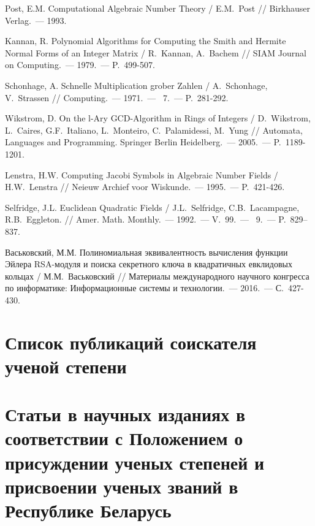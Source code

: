 \documentclass[_00_dissertation.tex]{subfiles}
\begin{document}
\begin{thebibliography}{99}
    Post, E.M. Computational Algebraic Number Theory / E.M.~Post // Birkhauser Verlag.~--- 1993.

    Kannan, R. Polynomial Algorithms for Computing the Smith and Hermite Normal Forms of an Integer Matrix / R.~Kannan, A.~Bachem // SIAM Journal on Computing.~--- 1979.~--- P.~499-507.

    Schonhage, A. Schnelle Multiplication grober Zahlen / A.~Schonhage, V.~Strassen // Computing.~--- 1971.~--- \textnumero~7.~--- P.~281-292.

    Wikstrom, D. On the l-Ary GCD-Algorithm in Rings of Integers / D.~Wikstrom, L.~Caires, G.F.~Italiano, L.~Monteiro, C.~Palamidessi, M.~Yung // Automata, Languages and Programming. Springer Berlin Heidelberg.~--- 2005.~--- P.~1189-1201.

    Lenstra, H.W. Computing Jacobi Symbols in Algebraic Number Fields / H.W.~Lenstra // Neieuw Archief voor Wiskunde.~--- 1995.~--- P.~421-426.

    Selfridge, J.L. Euclidean Quadratic Fields / J.L.~Selfridge, C.B.~Lacampagne, R.B.~Eggleton. // Amer. Math. Monthly.~--- 1992.~--- V.~99.~--- \textnumero~9.~--- P.~829--837.

    Васьковский, М.М. Полиномиальная эквивалентность вычисления функции Эйлера RSA-модуля и поиска секретного ключа в квадратичных евклидовых кольцах / М.М.~Васьковский // Материалы международного научного конгресса по информатике: Информационные системы и технологии.~--- 2016.~--- С.~427-430.

\end{thebibliography}

\newpage
\section*{Список публикаций соискателя ученой степени}

\renewcommand{\labelenumi}{\arabic{enumi}--A}
\renewcommand{\theenumi}{\arabic{enumi}--A}

\vspace{-4ex}
\section*{\fontsize{14}{15}\selectfont Статьи в научных изданиях в соответствии с Положением о присуждении ученых степеней и присвоении ученых званий в Республике Беларусь}
\vspace{-4ex}
\end{document}
